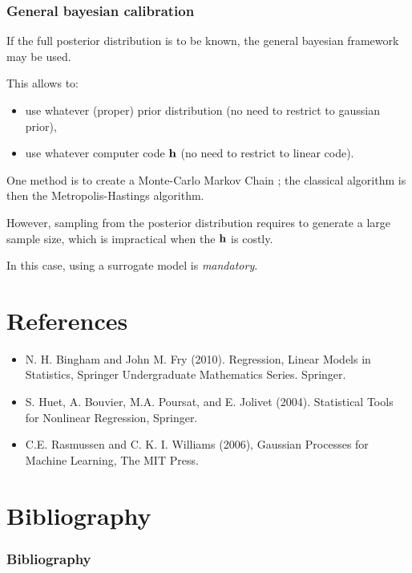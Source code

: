 \documentclass{beamer}
\begin{document}
\begin{frame}
\frametitle{General bayesian calibration}

If the full posterior distribution is to be known, the 
general bayesian framework may be used. 

This allows to:
\begin{itemize}
\item use whatever (proper) prior distribution (no need to restrict to gaussian 
prior),
\item use whatever computer code ${\bf h}$ (no need to restrict to linear 
code).
\end{itemize}

One method is to create a Monte-Carlo Markov Chain ; the classical algorithm is then the 
Metropolis-Hastings algorithm. 

However, sampling from the posterior distribution 
requires to generate a large sample size, which is impractical 
when the ${\bf h}$ is costly. 

In this case, using a surrogate model is \emph{mandatory}. 

\end{frame}

\section{References}

\begin{itemize}
\item  N. H. Bingham and John M. Fry (2010). Regression, Linear Models in Statistics, Springer Undergraduate Mathematics Series. Springer.
\item S. Huet, A. Bouvier, M.A. Poursat, and E. Jolivet (2004). Statistical Tools for Nonlinear Regression, Springer.
\item C.E. Rasmussen and C. K. I. Williams (2006), Gaussian Processes for Machine Learning, The MIT Press.
\end{itemize}

\section{Bibliography}
\begin{frame}[allowframebreaks]
\frametitle{Bibliography}
\nocite{*}


\end{frame}
\end{document}
